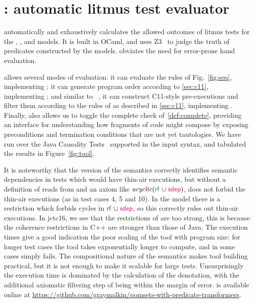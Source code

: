 \section{\PwTerTITLE: automatic litmus test evaluator}
\label{sec:tool}

\PwTer{} automatically and exhaustively calculates the allowed outcomes of litmus tests for the \PwT, \PwTpo, and \PwTc{} models. It is built in OCaml, and uses Z3~\cite{Z3Solver} to judge the truth of predicates constructed by the models. \PwTer{} obviates the need for error-prone hand evaluation.

\PwTer{} allows several modes of evaluation: it can evaluate the rules of Fig.~\ref{fig:seq}, implementing \PwT; it can generate program order according to \textsection\ref{sec:c11}, implementing \PwTpo; and similar to \MRD~\cite{DBLP:conf/esop/PaviottiCPWOB20}, it can construct C11-style pre-executions and filter them according to the rules of \rcXI{} as described in \textsection\ref{sec:c11}, implementing \PwTc{}.
Finally, \PwTer{} also allows us to toggle the complete check of~\ref{def:complete}, providing an interface for understanding how fragments of code might compose by exposing preconditions and termination conditions that are not yet tautologies.
We have run \PwTer{} over the Java Causality Tests~\cite{PughWebsite} supported in the input syntax, and tabulated the results in Figure~\ref{fig:tool}.

It is noteworthy that the \PwT{} version of the semantics correctly identifies semantic dependencies in tests which would have thin-air executions, but without a definition of reads from and an axiom like $\textit{acyclic}(\rrfx \cup \rsdepx)$, \PwT{} does not forbid the thin-air executions (as in test cases 4, 5 and 10).
In the \PwTc{} model there is a restriction which forbids cycles in $\rrfx \cup \rsdepx$, so this correctly rules out thin-air executions.
In jctc16, we see that the restrictions of \PwTc{} are too strong, this is because the coherence restrictions in C++ are stronger than those of Java.
The execution times give a good indication the poor scaling of the tool with program size: for longer test cases the tool takes exponentially longer to compute, and in some cases simply fails.
The compositional nature of the semantics makes tool building practical, but it is not enough to make it scalable for large tests.
Unsurprisingly the execution time is dominated by the calculation of the denotation, with the additional axiomatic filtering step of \PwTc{} being within the margin of error. 
\PwTer{} is available online at \url{https://github.com/graymalkin/pomsets-with-predicate-transformers}.

